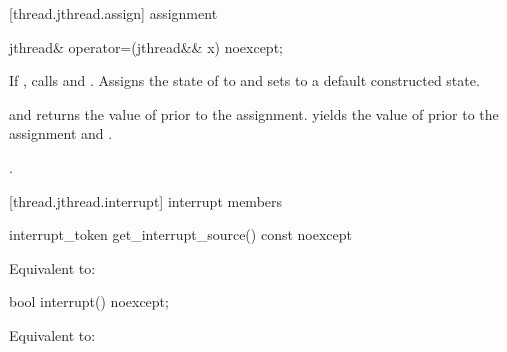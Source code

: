 [thread.jthread.assign]{ assignment}

%
\begin{itemdecl}
jthread& operator=(jthread&& x) noexcept;
\end{itemdecl}

\begin{itemdescr}
\pnum
\effects If , calls  and .
Assigns the
state of  to  and sets  to a default constructed state.

{\color{diffcolor}
\pnum
\postconditions {} and  returns the value of
 prior to the assignment.
 yields the value of  prior to the assignment
and .
}%

\pnum
\returns {}.
\end{itemdescr}


[thread.jthread.interrupt]{ interrupt members}

{\color{diffcolor}
%
\begin{itemdecl}
interrupt_token get_interrupt_source() const noexcept
\end{itemdecl}
\begin{itemdescr}
  \pnum\effects Equivalent to: 
\end{itemdescr}

%
\begin{itemdecl}
bool interrupt() noexcept;
\end{itemdecl}
\begin{itemdescr}
  \pnum\effects Equivalent to: 
\end{itemdescr}
}%

%
%
%

